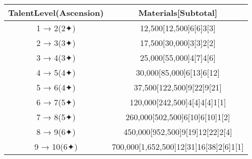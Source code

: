 \documentclass[a4paper,12pt]{article}
\begin{document}
\begin{tabular}{|c|c|} \hline
TalentLevel(Ascension) & Materials[Subtotal] \\
 \hline
1 → 2(2✦) & 12,500[12,500]6[6]3[3] \\
2 → 3(3✦) & 17,500[30,000]3[3]2[2] \\
3 → 4(3✦) & 25,000[55,000]4[7]4[6] \\
4 → 5(4✦) & 30,000[85,000]6[13]6[12] \\
5 → 6(4✦) & 37,500[122,500]9[22]9[21] \\
6 → 7(5✦) & 120,000[242,500]4[4]4[4]1[1] \\
7 → 8(5✦) & 260,000[502,500]6[10]6[10]1[2] \\
8 → 9(6✦) & 450,000[952,500]9[19]12[22]2[4] \\
9 → 10(6✦) & 700,000[1,652,500]12[31]16[38]2[6]1[1] \\
\end{tabular}\\ \par \vspace{0.5cm}
\end{document}
